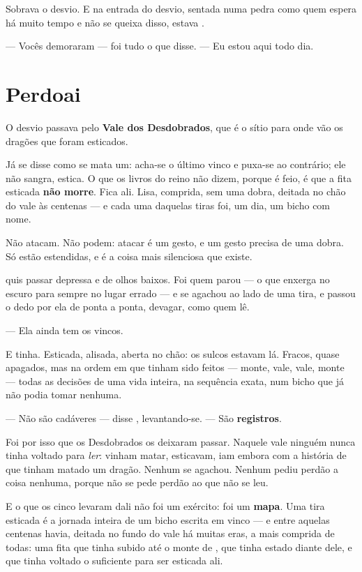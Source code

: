 \documentclass[livro.tex]{subfiles}
\begin{document}
Sobrava o desvio. E na entrada do desvio, sentada numa pedra como quem espera há muito tempo e
não se queixa disso, estava \Qui .

--- Vocês demoraram --- foi tudo o que disse. --- Eu estou aqui todo dia.

\chapter{Perdoai}

O desvio passava pelo \textbf{Vale dos Desdobrados}, que é o sítio para onde vão os dragões que
foram esticados.

Já se disse como se mata um: acha-se o último vinco e puxa-se ao contrário; ele não sangra,
estica. O que os livros do reino não dizem, porque é feio, é que a fita esticada \textbf{não
morre}. Fica ali. Lisa, comprida, sem uma dobra, deitada no chão do vale às centenas --- e cada
uma daquelas tiras foi, um dia, um bicho com nome.

Não atacam. Não podem: atacar é um gesto, e um gesto precisa de uma dobra. Só estão estendidas, e
é a coisa mais silenciosa que existe.

\medskip

\Yas quis passar depressa e de olhos baixos. Foi \Drk quem parou --- o que enxerga no escuro para
sempre no lugar errado --- e se agachou ao lado de uma tira, e passou o dedo por ela de ponta a
ponta, devagar, como quem lê.

--- Ela ainda tem os vincos.

E tinha. Esticada, alisada, aberta no chão: os sulcos estavam lá. Fracos, quase apagados, mas na
ordem em que tinham sido feitos --- monte, vale, vale, monte --- todas as decisões de uma vida
inteira, na sequência exata, num bicho que já não podia tomar nenhuma.

--- Não são cadáveres --- disse \Drk , levantando-se. --- São \textbf{registros}.

\medskip

Foi por isso que os Desdobrados os deixaram passar. Naquele vale ninguém nunca tinha voltado para
\emph{ler}: vinham matar, esticavam, iam embora com a história de que tinham matado um dragão.
Nenhum se agachou. Nenhum pediu perdão a coisa nenhuma, porque não se pede perdão ao que não se
leu.

E o que os cinco levaram dali não foi um exército: foi um \textbf{mapa}. Uma tira esticada é a
jornada inteira de um bicho escrita em vinco --- e entre aquelas centenas havia, deitada no fundo
do vale há muitas eras, a mais comprida de todas: uma fita que tinha subido até o monte de \Ven ,
que tinha estado diante dele, e que tinha voltado o suficiente para ser esticada ali.
\end{document}
